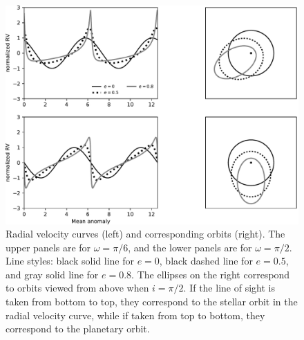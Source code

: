 \begin{figure}[]
\begin{center}
\includegraphics[width=\linewidth]{fig/rvsim.pdf}
\end{center}
\caption{Radial velocity curves (left) and corresponding orbits (right). The upper panels are for $\omega=\pi/6$, and the lower panels are for $\omega=\pi/2$. Line styles: black solid line for $e=0$, black dashed line for $e=0.5$, and gray solid line for $e=0.8$. The ellipses on the right correspond to orbits viewed from above when $i=\pi/2$. If the line of sight is taken from bottom to top, they correspond to the stellar orbit in the radial velocity curve, while if taken from top to bottom, they correspond to the planetary orbit. \label{fig:rvsim}}
\end{figure}

